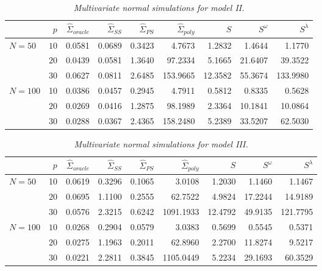 \begin{table}[H]
\centering
\caption{\textit{Multivariate normal simulations for model II.}}
\begin{tabular}{lrrrrrrrr}
 & $p$ &$\hat{\Sigma}_{oracle}$& $\hat{\Sigma}_{SS}$& $\hat{\Sigma}_{PS}$ & $\hat{\Sigma}_{poly}$ & $S$ &$S^\omega$& $S^\lambda$ \\ 
  \hline
   $N = 50$ & $10$ & 0.0581 &  0.0689 & 0.3423 &4.7673 & 1.2832 & 1.4644 & 1.1770 \\ 
   & $20$ &0.0439 & 0.0581 & 1.3640 &  97.2334 & 5.1665 & 21.6407 & 39.3522 \\ 
     & $30$ & 0.0627 & 0.0811 & 2.6485 &  153.9665 & 12.3582 & 55.3674 & 133.9980 \\ 
  $N = 100$ & 10 &  0.0386 & 0.0457 & 0.2945 & 4.7911 & 0.5812 & 0.8335 & 0.5628 \\ 
    & $20$ & 0.0269 & 0.0416 & 1.2875 &  98.1989 & 2.3364 & 10.1841 & 10.0864 \\ 
    & $30$ &  0.0288 & 0.0367 & 2.4365 & 158.2480 & 5.2389 & 33.5207 & 62.5030 \\ 
   \hline
\end{tabular}
\label{table:simulation-1-entropy-loss-sigma-2}
\end{table}


%
%


\begin{table}[H]
\centering
\caption{\textit{Multivariate normal simulations for model III.} }
\begin{tabular}{lrrrrrrrr}
 & $p$ &$\hat{\Sigma}_{oracle}$&  $\hat{\Sigma}_{SS}$& $\hat{\Sigma}_{PS}$ &$\hat{\Sigma}_{poly}$ & $S$ &$S^\omega$& $S^\lambda$ \\ 
   \hline
 $N = 50$ & 10 & 0.0619 & 0.3296 & 0.1065 & 3.0108 & 1.2030 & 1.1460 & 1.1467 \\ 
      & $20$ &0.0695 & 1.1100 & 0.2555 &  62.7522 & 4.9824 & 17.2244 & 14.9189 \\ 
    & $30$ &0.0576 & 2.3215 & 0.6242 &  1091.1933 & 12.4792 & 49.9135 & 121.7795 \\ 
     $N = 100$ & $10$ & 0.0268 &  0.2904 & 0.0579 &3.0383 & 0.5699 & 0.5545 & 0.5371 \\ 
     & $20$ & 0.0275 & 1.1963 & 0.2011 & 62.8960 & 2.2700 & 11.8274 & 9.5217 \\ 
    & $30$ &  0.0221 & 2.2811 & 0.3845 &1105.0449 & 5.2234 & 29.1693 & 60.3529 \\ 
   \hline
\end{tabular}
\label{table:simulation-1-entropy-loss-sigma-3}
\end{table}

